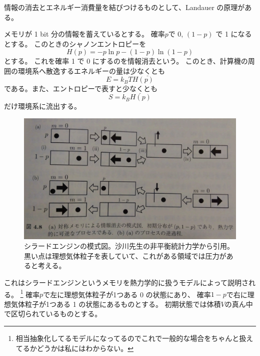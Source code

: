 \documentclass[../../master.tex]{subfiles}
\begin{document}
情報の消去とエネルギー消費量を結びつけるものとして、Landauer の原理がある。\\
\begin{tcolorbox}[title = Landauer の原理]
    メモリが 1 bit 分の情報を蓄えているとする。
    確率\(p\)で 0, \((1-p)\) で 1 になるとする。
    このときのシャノンエントロピーを
    \begin{equation*}
        H(p) = -p \ln p -(1-p)\ln(1-p)
    \end{equation*}
    とする。
    これを確率 1 で 0 にするのを情報消去という。
    このとき、計算機の周囲の環境系へ散逸するエネルギーの量は\(\underline{少なくとも}\)
    \begin{equation*}
        E = k_B T H(p)
    \end{equation*}
    である。また、エントロピーで表すと\(\underline{少なくとも}\)
    \begin{equation*}
        S = k_B H(p)
    \end{equation*}
    だけ環境系に流出する。
\end{tcolorbox}
\begin{figure}
    \centering
    \includegraphics[width=0.4\columnwidth]{3-5-1.JPG}
    \caption{シラードエンジンの模式図。沙川先生の非平衡統計力学から引用。
    黒い点は理想気体粒子を表していて、これがある領域では圧力があると考える。}
\end{figure}

これはシラードエンジンというメモリを熱力学的に扱うモデルによって説明される。
\footnote{相当抽象化してるモデルになってるのでこれで一般的な場合をちゃんと扱えてるかどうかは私にはわからない。}
確率\(p\)で左に理想気体粒子が1つある 0 の状態にあり、
確率\(1-p\)で右に理想気体粒子が1つある 1 の状態にあるものとする。
初期状態では体積\(V\)の真ん中で区切られているものとする。
\end{document}
